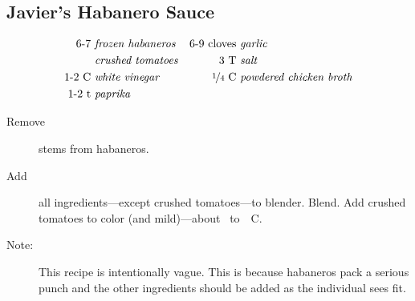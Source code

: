 \subsection{Javier's Habanero Sauce}

\begin{align*}
    \text{6-7} &~\text{\emph{frozen habaneros}} & \text{6-9~cloves} &~\text{\emph{garlic}} \\
    \text{} &~\text{\emph{crushed tomatoes}}    & \text{3~T} &~\text{\emph{salt}} \\
    \text{1-2~C} &~\text{\emph{white vinegar}}  & \text{\nicefrac{1}{4}~C} &~\text{\emph{powdered chicken broth}} \\
    \text{1-2~t} &~\text{\emph{paprika}}        & \text{} &~\text{\emph{}}
\end{align*}

\begin{description}
    \item[Remove]stems from habaneros.
    \item[Add]all ingredients---except crushed tomatoes---to blender. Blend. Add crushed tomatoes to color (and mild)---about ~to~~C.
    \item[Note:]This recipe is intentionally vague. This is because habaneros pack a serious punch and the other ingredients should be added as the individual sees fit.
\end{description}

\pagebreak
